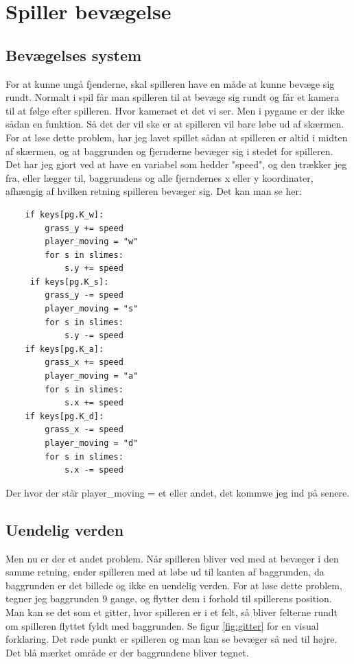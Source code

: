 \documentclass{article}
\begin{document}
\section{Spiller bevægelse}
    \subsection{Bevægelses system}
    For at kunne ungå fjenderne, skal spilleren have en måde at kunne bevæge sig rundt.
    Normalt i spil får man spilleren til at bevæge sig rundt og får et kamera til at følge efter spilleren. 
    Hvor kameraet et det vi ser. Men i pygame er der ikke sådan en funktion. Så det der vil ske er at spilleren vil bare løbe ud af skærmen.
    For at løse dette problem, har jeg lavet spillet sådan at spilleren er altid i midten af skærmen, og at baggrunden og fjernderne bevæger sig i stedet for spilleren.
    Det har jeg gjort ved at have en variabel som hedder "speed", og den trækker jeg fra, eller lægger til, 
    baggrundens og alle fjerndernes x eller y koordinater, afhængig af hvilken retning spilleren bevæger sig.
    Det kan man se her:

    \begin{verbatim}
    if keys[pg.K_w]:
        grass_y += speed
        player_moving = "w"
        for s in slimes:
            s.y += speed
     if keys[pg.K_s]:
        grass_y -= speed
        player_moving = "s"
        for s in slimes:
            s.y -= speed
    if keys[pg.K_a]:
        grass_x += speed
        player_moving = "a"
        for s in slimes:
            s.x += speed
    if keys[pg.K_d]:
        grass_x -= speed
        player_moving = "d"
        for s in slimes:
            s.x -= speed
    \end{verbatim}
    
    Der hvor der står player\_moving = et eller andet, det kommwe jeg ind på senere.

    \subsection{Uendelig verden}
    Men nu er der et andet problem. Når spilleren bliver ved med at bevæger i den samme retning,
    ender spilleren med at løbe ud til kanten af baggrunden, da baggrunden er det billede og ikke en uendelig verden.
    For at løse dette problem, tegner jeg baggrunden 9 gange, og flytter dem i forhold til spillerens position.
    Man kan se det som et gitter, hvor spilleren er i et felt, så bliver felterne rundt om spilleren flyttet fyldt med baggrunden.
    Se figur \ref{fig:gitter} for en visual forklaring. Det røde punkt er spilleren og man kan se bevæger så ned til højre.
    Det blå mærket område er der baggrundene bliver tegnet.
\end{document}
